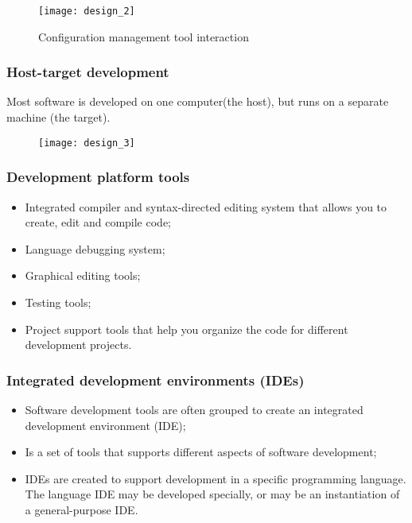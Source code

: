 \documentclass[../ESOF_notes.tex]{subfiles}
\begin{document}
\begin{figure}[H]
    \centering
    \texttt{[image: design\_2]}
    \caption{Configuration management tool interaction}
\end{figure}

\subsubsection{Host-target development}
Most software is developed on one computer(the host), but runs on a separate machine (the target).

\begin{figure}[H]
    \centering
    \texttt{[image: design\_3]}
\end{figure}

\subsubsection{Development platform tools}
\begin{itemize}
    \item Integrated compiler and syntax-directed editing system that allows you to create, edit and compile code;
    \item Language debugging system;
    \item Graphical editing tools;
    \item Testing tools;
    \item Project support tools that help you organize the code for different development projects.
\end{itemize}

\subsubsection{Integrated development environments
    (IDEs)}
\begin{itemize}
    \item Software development tools are often grouped to create an integrated development environment (IDE);
    \item Is a set of tools that supports different aspects of software development;
    \item IDEs are created to support development in a specific programming language. The language IDE may be developed specially, or may be an instantiation of a general-purpose IDE.
\end{itemize}
\end{document}
